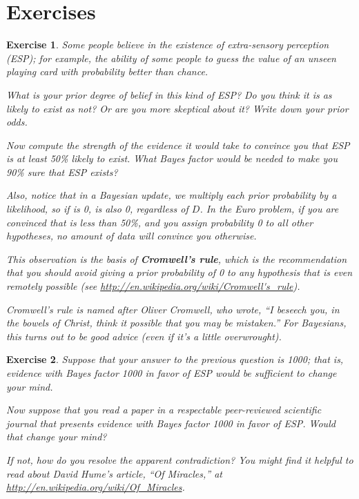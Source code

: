 \documentclass[12pt]{book}
\theoremstyle{exercise}
\newtheorem{exercise}{Exercise}[chapter]
\begin{document}
\section{Exercises}


\begin{exercise}
Some people believe in the existence of extra-sensory
perception (ESP); for example, the ability of some people to guess
the value of an unseen playing card with probability better
than chance.

What is your prior degree of belief in this kind of ESP?
Do you think it is as likely to exist as not?  Or are you
more skeptical about it?  Write down your prior odds.

Now compute the strength of the evidence it would take to
convince you that ESP is at least 50\% likely to exist.
What Bayes factor would be needed to make you 90\% sure
that ESP exists?

Also, notice that in a Bayesian update, we multiply
each prior probability by a likelihood, so if  is 0,
 is also 0, regardless of $D$.  In the Euro problem,
if you are convinced that  is less than 50\%, and you assign
probability 0 to all other hypotheses, no amount of data will
convince you otherwise.

This observation is the basis of {\bf Cromwell's rule}, which is the
recommendation that you should avoid giving a prior probability of
0 to any hypothesis that is even remotely possible
(see \url{http://en.wikipedia.org/wiki/Cromwell's_rule}).

Cromwell's rule is named after Oliver Cromwell, who wrote, ``I beseech
you, in the bowels of Christ, think it possible that you may be
mistaken.''  For Bayesians, this turns out to be good advice (even if
it's a little overwrought).
\end{exercise}


\begin{exercise}
Suppose that your answer to the previous question is 1000;
that is, evidence with Bayes factor 1000 in favor of ESP would
be sufficient to change your mind.

Now suppose that you read a paper in a respectable peer-reviewed
scientific journal that presents evidence with Bayes factor 1000 in
favor of ESP.  Would that change your mind?

If not, how do you resolve the apparent contradiction?
You might find it helpful to read about David Hume's article, ``Of
Miracles,'' at \url{http://en.wikipedia.org/wiki/Of_Miracles}.

\end{exercise}
\end{document}
